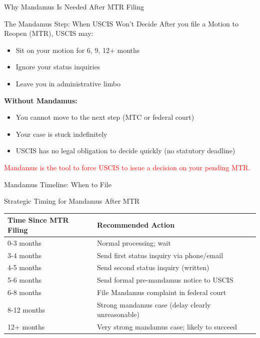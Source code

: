 \documentclass[11pt]{beamer}
\begin{document}
	\begin{frame}{Why Mandamus Is Needed After MTR Filing}
		\scriptsize
		\begin{block}{The Mandamus Step: When USCIS Won't Decide}
			After you file a Motion to Reopen (MTR), USCIS may:
			\vspace{0.2cm}
			\begin{itemize}
				\item Sit on your motion for 6, 9, 12+ months
				\item Ignore your status inquiries
				\item Leave you in administrative limbo
			\end{itemize}
			\textbf{Without Mandamus:}
			\begin{itemize}
				\item You cannot move to the next step (MTC or federal court)
				\item Your case is stuck indefinitely
				\item USCIS has no legal obligation to decide quickly (no statutory deadline)
			\end{itemize}
			\textcolor{red}{Mandamus is the tool to force USCIS to issue a decision on your pending MTR.}
		\end{block}
	\end{frame}
	
	\begin{frame}{Mandamus Timeline: When to File}
		\scriptsize
		\begin{block}{Strategic Timing for Mandamus After MTR}
			\begin{tabular}{|p{3cm}|p{6cm}|}
				\hline
				\textbf{Time Since MTR Filing} & \textbf{Recommended Action} \\
				\hline
				0-3 months & Normal processing; wait \\
				\hline
				3-4 months & Send first status inquiry via phone/email \\
				\hline
				4-5 months & Send second status inquiry (written) \\
				\hline
				5-6 months & Send formal pre-mandamus notice to USCIS \\
				\hline
				6-8 months & File Mandamus complaint in federal court \\
				\hline
				8-12 months & Strong mandamus case (delay clearly unreasonable) \\
				\hline
				12+ months & Very strong mandamus case; likely to succeed \\
				\hline
			\end{tabular}
		\end{block}
	\end{frame}
	
\end{document}

